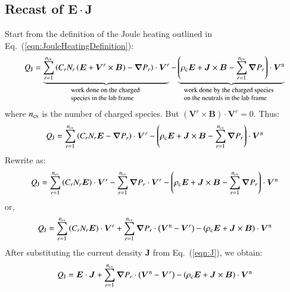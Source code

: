 \documentclass{warpdoc}
\newcommand{\ncs}{{n_{\rm cs}}}
\renewcommand{\vec}[1]{\bm{#1}}
\begin{document}
\subsection{Recast of $\vec{E}\cdot \vec{J}$}

Start from the definition of the Joule heating outlined in Eq.\ (\ref{eqn:JouleHeatingDefinition}):
%
\begin{equation}
 Q_{\rm J} = \underbrace{  \sum_{r=1}^\ncs \left( C_r N_r \left( \vec{E}+\vec{V}^r \times\vec{B}\right)  - \vec{\nabla} P_r \right)\cdot \vec{V}^r}_{\textrm{\begin{minipage}{3cm}\flushleft \footnotesize work done on the charged species in the lab frame\end{minipage}}} 
- \underbrace{\left(\rho_{\rm c} \vec{E} + \vec{J}\times\vec{B} -\sum_{r=1}^\ncs \vec{\nabla} P_r \right)\cdot \vec{V}^{\rm n}}_{\textrm{\begin{minipage}{4cm}\flushleft \footnotesize work done by the charged species on the neutrals in the lab frame\end{minipage}}}
\end{equation}
%
where $n_{\rm cs}$ is the number of charged species. But $(\vec{V}^r \times\vec{B})\cdot \vec{V}^r=0$. Thus:
%
\begin{equation}
 Q_{\rm J} =   \sum_{r=1}^\ncs \left( C_r N_r  \vec{E}  - \vec{\nabla} P_r \right)\cdot \vec{V}^r 
- \left(\rho_{\rm c} \vec{E} + \vec{J}\times\vec{B} -\sum_{r=1}^\ncs \vec{\nabla} P_r \right)\cdot \vec{V}^{\rm n}
\end{equation}
%
Rewrite as:
%
\begin{equation}
 Q_{\rm J} =   \sum_{r=1}^\ncs \left( C_r N_r  \vec{E}   \right)\cdot \vec{V}^r 
-  \sum_{r=1}^\ncs \vec{\nabla} P_r \cdot \vec{V}^r 
- \left(\rho_{\rm c} \vec{E} + \vec{J}\times\vec{B} -\sum_{r=1}^\ncs \vec{\nabla} P_r \right)\cdot \vec{V}^{\rm n}
\end{equation}
%
or,
%
\begin{equation}
 Q_{\rm J} =   \sum_{r=1}^\ncs \left( C_r N_r  \vec{E}   \right)\cdot \vec{V}^r 
+  \sum_{r=1}^\ncs \vec{\nabla} P_r \cdot \left(\vec{V}^{\rm n}-\vec{V}^r\right) 
- \left(\rho_{\rm c} \vec{E} + \vec{J}\times\vec{B} \right)\cdot \vec{V}^{\rm n}
\end{equation}
%
After substituting the current density $\vec{J}$ from Eq.\ (\ref{eqn:J}), we obtain: 
%
\begin{equation}
 Q_{\rm J} =     \vec{E} \cdot \vec{J} 
+  \sum_{r=1}^\ncs \vec{\nabla} P_r \cdot \left(\vec{V}^{\rm n}-\vec{V}^r\right) 
- \left(\rho_{\rm c} \vec{E} + \vec{J}\times\vec{B} \right)\cdot \vec{V}^{\rm n}
\end{equation}
\end{document}
